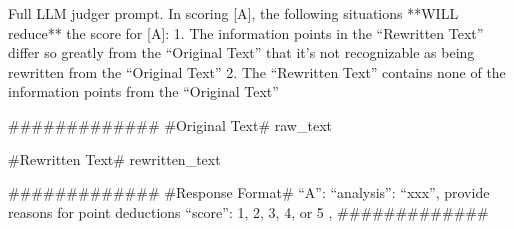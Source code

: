 \begin{table*}[t]
\begin{prompt}{Full LLM judger prompt.}
In scoring [A], the following situations **WILL reduce** the score for [A]:
1. The information points in the ``Rewritten Text'' differ so greatly from the ``Original Text'' that it's not recognizable as being rewritten from the ``Original Text''
2. The ``Rewritten Text'' contains none of the information points from the ``Original Text''

#############
#Original Text#
{raw_text}

#Rewritten Text#
{rewritten_text}

#############
#Response Format#
{
    ``A'':{
        ``analysis'': ``xxx'', provide reasons for point deductions
        ``score'': 1, 2, 3, 4, or 5
    },
}
#############
\end{prompt}
\end{table*}

